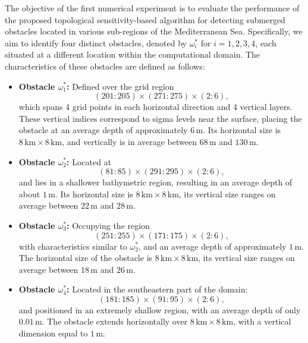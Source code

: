 \documentclass[a4paper,12pt,reqno,natbib]{amsart}
\begin{document}
The objective of the first numerical experiment is to evaluate the performance of the proposed topological sensitivity-based algorithm for detecting submerged obstacles located in various sub-regions of the Mediterranean Sea. Specifically, we aim to identify four distinct obstacles, denoted by \( \omega_i^* \) for \( i = 1, 2, 3, 4 \), each situated at a different location within the computational domain. The characteristics of these obstacles are defined as follows:
\begin{itemize}
    \item \textbf{Obstacle \( \omega_1^* \):} Defined over the grid region
    \[
    (201{:}205) \times (271{:}275) \times (2{:}6),
    \]
    which spans 4 grid points in each horizontal direction and 4 vertical layers. These vertical indices correspond to sigma levels near the surface, placing the obstacle at an average depth of approximately \( 6\,\mathrm{m} \). Its horizontal size is \( 8\,\text{km} \times 8\,\text{km} \), and vertically is in average between \( 68\,\mathrm{m} \) and \( 130\,\mathrm{m} \). 
    
    \item \textbf{Obstacle \( \omega_2^* \):} Located at
    \[
    (81{:}85) \times (291{:}295) \times (2{:}6),
    \]
    and lies in a shallower bathymetric region, resulting in an average depth of about \( 1\,\mathrm{m} \). Its horizontal size is \( 8\,\text{km} \times 8\,\text{km} \), its vertical size ranges on average between \( 22\,\mathrm{m} \) and \( 28\,\mathrm{m} \).

    \item \textbf{Obstacle \( \omega_3^* \):} Occupying the region
    \[
    (251{:}255) \times (171{:}175) \times (2{:}6),
    \]
    with characteristics similar to \( \omega_2^* \), and an average depth of approximately \( 1\,\mathrm{m} \). The horizontal size of the obstacle is \( 8\,\text{km} \times 8\,\text{km} \), its vertical size ranges on average between \( 18\,\mathrm{m} \) and \( 26\,\mathrm{m} \).

    \item \textbf{Obstacle \( \omega_4^* \):} Located in the southeastern part of the domain:
    \[
    (181{:}185) \times (91{:}95) \times (2{:}6),
    \]
    and positioned in an extremely shallow region, with an average depth of only \( 0.01\,\mathrm{m} \). The obstacle extends horizontally over \( 8\,\text{km} \times 8\,\text{km} \), with a vertical dimension equal to \( 1\,\mathrm{m} \).
\end{itemize}
\end{document}
